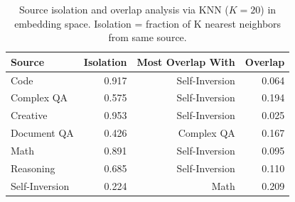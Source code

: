 \begin{table}[t]
\centering
\caption{Source isolation and overlap analysis via KNN ($K=20$) in embedding space. Isolation = fraction of K nearest neighbors from same source.}
\label{tab:source_overlap}
\small
\begin{tabular}{lrrr}
\toprule
\textbf{Source} & \textbf{Isolation} & \textbf{Most Overlap With} & \textbf{Overlap} \\
\midrule
Code & 0.917 & Self-Inversion & 0.064 \\
Complex QA & 0.575 & Self-Inversion & 0.194 \\
Creative & 0.953 & Self-Inversion & 0.025 \\
Document QA & 0.426 & Complex QA & 0.167 \\
Math & 0.891 & Self-Inversion & 0.095 \\
Reasoning & 0.685 & Self-Inversion & 0.110 \\
Self-Inversion & 0.224 & Math & 0.209 \\
\bottomrule
\end{tabular}
\end{table}